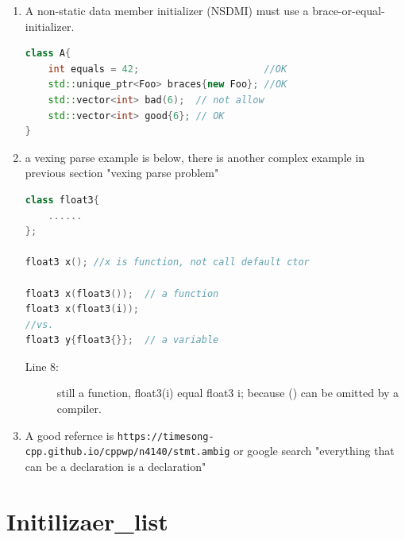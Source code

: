 \documentclass[a4paper,11pt,twoside]{book}
\begin{document}
\begin{enumerate}
	\item A non-static data member initializer (NSDMI) must use a brace-or-equal-initializer.
\begin{lstlisting}[frame=single, language=c++, mathescape=true]
class A{
	int equals = 42;                      //OK
	std::unique_ptr<Foo> braces{new Foo}; //OK
	std::vector<int> bad(6);  // not allow
	std::vector<int> good{6}; // OK  
}  
\end{lstlisting}
	
	\item a vexing parse example is below, there is another complex example in previous section "vexing parse problem"
\begin{lstlisting}[frame=single, language=c++]
class float3{
	......
};
	
float3 x(); //x is function, not call default ctor
	
float3 x(float3());  // a function
float3 x(float3(i)); 
//vs.
float3 y{float3{}};  // a variable
\end{lstlisting}
\begin{description}
	\item[Line 8:] still a function, float3(i) equal float3 i; because () can be omitted by a compiler. 
\end{description}
 
	
	\item A good refernce is \verb|https://timesong-cpp.github.io/cppwp/n4140/stmt.ambig| or google search 
	"everything that can be a declaration is a declaration" 
\end{enumerate}


\section{Initilizaer\_list}
\end{document}
